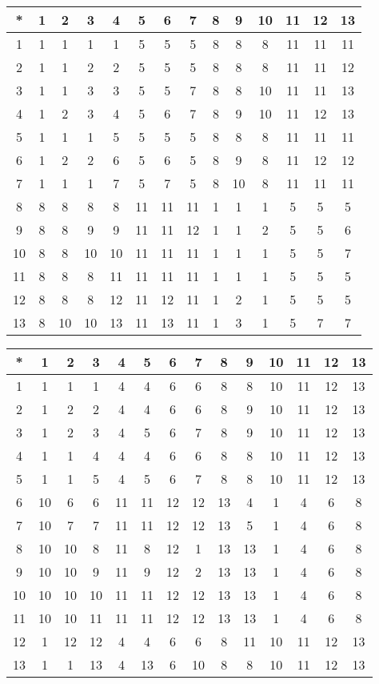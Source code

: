 \begin{tabular}[t]{c|ccccccccccccc}
*&1&2&3&4&5&6&7&8&9&10&11&12&13 \\ \hline
    1&1&1&1&1&5&5&5&8&8&8&11&11&11 \\
    2&1&1&2&2&5&5&5&8&8&8&11&11&12 \\
    3&1&1&3&3&5&5&7&8&8&10&11&11&13 \\
    4&1&2&3&4&5&6&7&8&9&10&11&12&13 \\
    5&1&1&1&5&5&5&5&8&8&8&11&11&11 \\
    6&1&2&2&6&5&6&5&8&9&8&11&12&12 \\
    7&1&1&1&7&5&7&5&8&10&8&11&11&11 \\
    8&8&8&8&8&11&11&11&1&1&1&5&5&5 \\
    9&8&8&9&9&11&11&12&1&1&2&5&5&6 \\
    10&8&8&10&10&11&11&11&1&1&1&5&5&7 \\
    11&8&8&8&11&11&11&11&1&1&1&5&5&5 \\
    12&8&8&8&12&11&12&11&1&2&1&5&5&5 \\
    13&8&10&10&13&11&13&11&1&3&1&5&7&7 
\end{tabular}


\begin{tabular}[t]{c|ccccccccccccc}
*&1&2&3&4&5&6&7&8&9&10&11&12&13 \\ \hline
    1&1&1&1&4&4&6&6&8&8&10&11&12&13 \\
    2&1&2&2&4&4&6&6&8&9&10&11&12&13 \\
    3&1&2&3&4&5&6&7&8&9&10&11&12&13 \\
    4&1&1&4&4&4&6&6&8&8&10&11&12&13 \\
    5&1&1&5&4&5&6&7&8&8&10&11&12&13 \\
    6&10&6&6&11&11&12&12&13&4&1&4&6&8 \\
    7&10&7&7&11&11&12&12&13&5&1&4&6&8 \\
    8&10&10&8&11&8&12&1&13&13&1&4&6&8 \\
    9&10&10&9&11&9&12&2&13&13&1&4&6&8 \\
    10&10&10&10&11&11&12&12&13&13&1&4&6&8 \\
    11&10&10&11&11&11&12&12&13&13&1&4&6&8 \\
    12&1&12&12&4&4&6&6&8&11&10&11&12&13 \\
    13&1&1&13&4&13&6&10&8&8&10&11&12&13 
\end{tabular}


